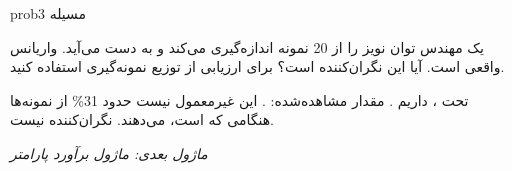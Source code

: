 \begin{PSbox}[unbreakable]{prob}{مسیله 3}

یک مهندس توان نویز را از 20 نمونه اندازه‌گیری می‌کند و  به دست می‌آید. واریانس واقعی  است. آیا این نگران‌کننده است؟ برای ارزیابی از توزیع نمونه‌گیری استفاده کنید.

\PSsolution{} تحت ، داریم . مقدار مشاهده‌شده: . این غیرمعمول نیست  حدود 31\% از نمونه‌ها هنگامی که  است،  می‌دهند. نگران‌کننده نیست.

\emph{ماژول بعدی: {ماژول  برآورد پارامتر}}\PSbr{}

\end{PSbox}
